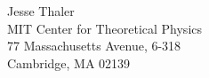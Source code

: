 Jesse Thaler\\
MIT Center for Theoretical Physics\\
77 Massachusetts Avenue, 6-318\\
Cambridge, MA 02139
